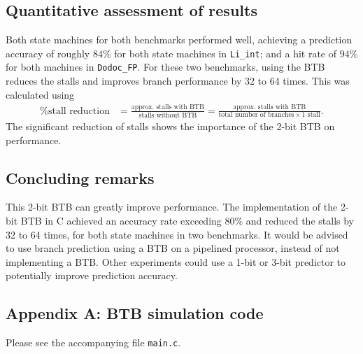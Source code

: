 \documentclass{article}
\begin{document}
	\subsection*{Quantitative assessment of results}
	Both state machines for both benchmarks performed well, achieving a prediction accuracy of roughly $84\%$ for both state machines in \texttt{Li\_int}; and a hit rate of $94\%$ for both machines in \texttt{Dodoc\_FP}. For these two benchmarks, using the BTB reduces the stalls and improves branch performance by 32 to 64 times. This was calculated using \begin{align}
		\text{\% stall reduction} & = \frac{\text{approx. stalls with BTB}}{\text{stalls without BTB}} = \frac{\text{approx. stalls with BTB}}{\text{total number of branches} \times 1 \text{ stall}}.
	\end{align}
	The significant reduction of stalls shows the importance of the 2-bit BTB on performance.
	
	\subsection*{Concluding remarks}
	This 2-bit BTB can greatly improve performance. The implementation of the 2-bit BTB in C achieved an accuracy rate exceeding 80\% and reduced the stalls by 32 to 64 times, for both state machines in two benchmarks. It would be advised to use branch prediction using a BTB on a pipelined processor, instead of not implementing a BTB. Other experiments could use a 1-bit or 3-bit predictor to potentially improve prediction accuracy.
	\pagebreak
	
	\subsection*{Appendix A: BTB simulation code}
	Please see the accompanying file \texttt{main.c}.
\end{document}
